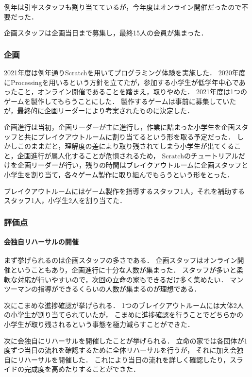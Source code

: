 例年は引率スタッフも割り当てているが，今年度はオンライン開催だったので不要だった．

企画スタッフは企画当日まで募集し，最終15人の会員が集まった．

\subsubsection*{企画}
2021年度は例年通りScratchを用いてプログラミング体験を実施した．
2020年度にProcessingを用いるという方針を立てたが，参加する小学生が低学年中心であったこと，オンライン開催であることを踏まえ，取りやめた．
2021年度は1つのゲームを製作してもらうことにした．
製作するゲームは事前に募集していたが，最終的に企画リーダーにより考案されたものに決定した．

企画進行は当初，企画リーダーが主に進行し，作業に詰まった小学生を企画スタッフと共にブレイクアウトルームに割り当てるという形を取る予定だった．
しかしこのままだと，理解度の差により取り残されてしまう小学生が出てくること，企画進行が属人化することが危惧されるため，
Scratchのチュートリアルだけを企画リーダーが行い，残りの時間はブレイクアウトルームに企画スタッフと小学生を割り当て，各々ゲーム製作に取り組んでもらうという形をとった．

ブレイクアウトルームにはゲーム製作を指導するスタッフ1人，それを補助するスタッフ1人，小学生2人を割り当てた．

\subsubsection*{評価点}
\paragraph{会独自リハーサルの開催}
まず挙げられるのは企画スタッフの多さである．
企画スタッフはオンライン開催ということもあり，企画進行に十分な人数が集まった．
スタッフが多いと柔軟な対応が行いやすいので，次回の立命の家もできるだけ多く集めたい．
マンツーマンの指導ができるくらいの人数が集まるのが理想である．

次にこまめな進捗確認が挙げられる．
1つのブレイクアウトルームには大体2人の小学生が割り当てられていたが，
こまめに進捗確認を行うことでどちらかの小学生が取り残されるという事態を極力減らすことができた．

次に会独自にリハーサルを開催したことが挙げられる．
立命の家では各団体が1度ずつ当日の流れを確認するために全体リハーサルを行うが，
それに加え会独自にリハーサルを開催した．
これにより当日の流れを詳しく確認したり，スライドの完成度を高めたりすることができた．

